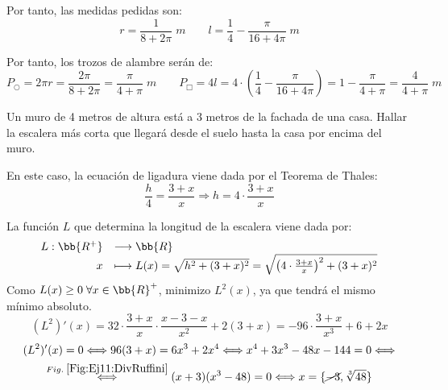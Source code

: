 \begin{ejercicio}
    Por tanto, las medidas pedidas son:
    \begin{equation*}
        r=\frac{1}{8+2\pi}\;m \qquad l=\frac{1}{4} - \frac{\pi}{16+4\pi}\;m
    \end{equation*}

    Por tanto, los trozos de alambre serán de:
    \begin{equation*}
        P_{\bigcirc} = 2\pi r = \frac{2\pi}{8+2\pi} = \frac{\pi}{4+\pi}\;m
        \qquad
        P_{\Box} = 4l = 4\cdot \left(\frac{1}{4} - \frac{\pi}{16+4\pi}\right) = 1-\frac{\pi}{4+\pi} = \frac{4}{4+\pi}\;m
    \end{equation*}
\end{ejercicio}

\begin{ejercicio}
    Un muro de 4 metros de altura está a 3 metros de la fachada de una casa. Hallar la escalera más corta que llegará desde el suelo hasta la casa por encima del muro.
    \begin{figure}[H]
        \centering
    \end{figure}
    En este caso, la ecuación de ligadura viene dada por el Teorema de Thales:
    \begin{equation*}
        \frac{h}{4} = \frac{3+x}{x} \Longrightarrow h=4\cdot \frac{3+x}{x}
    \end{equation*}

    La función $L$ que determina la longitud de la escalera viene dada por:
    \begin{equation*}
        \begin{array}{rl}
            L:\bb{R^+} & \longrightarrow \bb{R}\\
                    x & \longmapsto L(x)= \sqrt{h^2 + (3+x)^2} = \sqrt{\left(4\cdot \frac{3+x}{x}\right)^2 + (3+x)^2}
        \end{array}
    \end{equation*}
    Como $L(x)\geq 0 \;\forall x \in \bb{R}^+ $, minimizo $L^2(x)$, ya que tendrá el mismo mínimo absoluto.
    \begin{equation*}
        (L^2)'(x) = 32\cdot \frac{3+x}{x}\cdot \frac{x-3-x}{x^2} + 2(3+x) = -96\cdot \frac{3+x}{x^3} + 6 + 2x
    \end{equation*}
    \begin{multline*}
        (L^2)'(x) = 0\Longleftrightarrow 96(3+x) = 6x^3 + 2x^4 \Longleftrightarrow x^4 + 3x^3 -48x -144=0
        \Longleftrightarrow \\ \stackrel{Fig.\;\ref{Fig:Ej11:DivRuffini}}{\Longleftrightarrow}
        (x+3)(x^3-48) = 0 \Longleftrightarrow x=\{\cancel{-3}, \sqrt[3]{48}\}
    \end{multline*}


\end{ejercicio}
